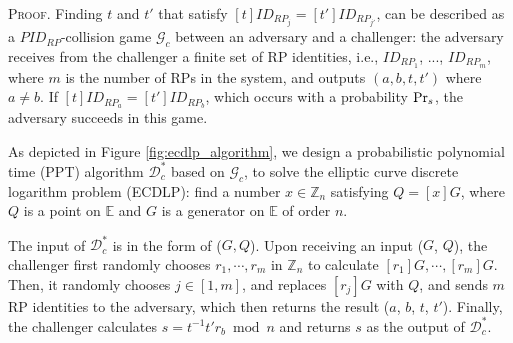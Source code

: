 \oldc
\vspace{0.75mm}
\noindent\textsc{Proof.}
Finding $t$ and $t'$ that satisfy $[t]ID_{RP_j} = [t']ID_{RP_{j'}}$, can be described as a $PID_{RP}$-collision game $\mathcal{G}_c$ between an adversary and a challenger: the adversary receives from the challenger a finite set of RP identities, i.e., $ID_{RP_1}$, ..., $ID_{RP_m}$, where $m$ is the number of RPs in the system, and outputs $(a, b, t, t')$ where $a \neq b$. If $[t]ID_{RP_a}=[t']ID_{RP_b}$, which occurs with a probability ${\rm Pr}_s$, the adversary succeeds in this game.

As depicted in Figure \ref{fig:ecdlp_algorithm}, we design a probabilistic polynomial time (PPT) algorithm $\mathcal{D}^*_c$
    based on $\mathcal{G}_c$, to solve the elliptic curve discrete logarithm problem (ECDLP): find a number $x \in \mathbb{Z}_n$ satisfying $Q = [x]G$,
where $Q$ is a point on $\mathbb{E}$ and $G$ is a generator on $\mathbb{E}$ of order $n$.



The input of $\mathcal{D}^*_c$ is in the form of ($G, Q$). Upon receiving an input ($G$, $Q$), the challenger first randomly chooses $r_1, \cdots, r_m$ in $\mathbb{Z}_n$ to calculate $[r_1]G, \cdots, [r_m]G$.
Then, it randomly chooses $j \in [1,m]$, and replaces $[r_j]G$ with $Q$, and sends $m$ RP identities to the adversary, which then returns the result ($a$, $b$, $t$, $t'$). Finally, the challenger calculates $s = t^{-1}t'r_b \bmod n$ and returns $s$ as the output of $\mathcal{D}^*_c$.

